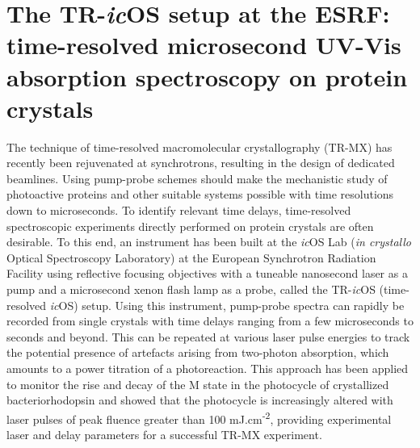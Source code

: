 \chapter{The TR-\textit{ic}OS setup at the ESRF: time-resolved microsecond UV-Vis absorption spectroscopy on protein crystals}\label{chap:TR-icOS}

\vspace{10mm}

The technique of time-resolved macromolecular crystallography (TR-MX) has recently been rejuvenated at synchrotrons, resulting in the design of dedicated beamlines. Using pump-probe schemes should make the mechanistic study of photoactive proteins and other suitable systems possible with time resolutions down to microseconds. To identify relevant time delays, time-resolved spectroscopic experiments directly performed on protein crystals are often desirable. To this end, an instrument has been built at the \textit{ic}OS Lab (\textit{in crystallo} Optical Spectroscopy Laboratory) at the European Synchrotron Radiation Facility using reflective focusing objectives with a tuneable nanosecond laser as a pump and a microsecond xenon flash lamp as a probe, called the TR-\textit{ic}OS (time-resolved \textit{ic}OS) setup. Using this instrument, pump-probe spectra can rapidly be recorded from single crystals with time delays ranging from a few microseconds to seconds and beyond. This can be repeated at various laser pulse energies to track the potential presence of artefacts arising from two-photon absorption, which amounts to a power titration of a photoreaction. This approach has been applied to monitor the rise and decay of the M state in the photocycle of crystallized bacteriorhodopsin and showed that the photocycle is increasingly altered with laser pulses of peak fluence greater than 100 mJ.cm\textsuperscript{-2}, providing experimental laser and delay parameters for a successful TR-MX experiment.



